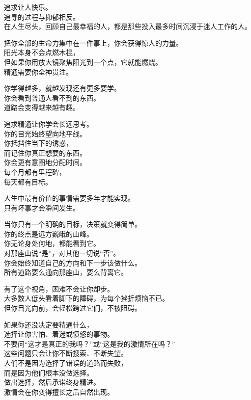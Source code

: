 \documentclass[
]{article}
\begin{document}
追求让人快乐。\\
追寻的过程与抑郁相反。\\
在人生尽头，回顾自己最幸福的人，都是那些投入最多时间沉浸于迷人工作的人。

把你全部的生命力集中在一件事上，你会获得惊人的力量。\\
阳光本身不会点燃木棍，\\
但如果你用放大镜聚焦阳光到一个点，它就能燃烧。\\
精通需要你全神贯注。

你学得越多，就越发现还有更多要学。\\
你会看到普通人看不到的东西。\\
道路会变得越来越有趣。

追求精通让你学会长远思考。\\
你的目光始终望向地平线。\\
你抵挡住当下的诱惑，\\
而记住你真正想要的东西。\\
你会更有意图地分配时间。\\
每个月都有里程碑，\\
每天都有目标。

人生中最有价值的事情需要多年才能实现。\\
只有坏事才会瞬间发生。

当你只有一个明确的目标，决策就变得简单。\\
你的终点是远方巍峨的山峰。\\
你无论身处何地，都能看到它。\\
对那座山说``是''，对其他一切说``否''。\\
你会始终知道自己的方向和下一步该做什么。\\
所有道路要么通向那座山，要么背离它。

有了这个视角，困难不会让你却步。\\
大多数人低头看着脚下的障碍，为每个挫折烦恼不已。\\
但你目光向前，会轻松跨过它们，不被阻碍。

如果你还没决定要精通什么，\\
选择让你害怕、着迷或愤怒的事物。\\
不要问``这才是真正的我吗？''或``这是我的激情所在吗？''\\
这些问题只会让你不断搜索、不断失望。\\
人们不是因为选择了错误的道路而失败，\\
而是因为他们根本没做选择。\\
做出选择，然后承诺终身精进。\\
激情会在你变得擅长之后自然出现。
\end{document}
